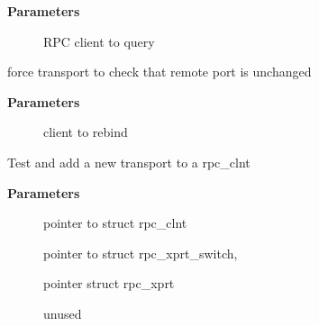 \documentclass[a4paper,8pt,english]{sphinxmanual}
\begin{document}
\textbf{Parameters}
\begin{description}
\item[{}] \leavevmode
RPC client to query

\end{description}

\begin{fulllineitems}
\label{networking/kapi:c.rpc_force_rebind}
force transport to check that remote port is unchanged

\end{fulllineitems}


\textbf{Parameters}
\begin{description}
\item[{}] \leavevmode
client to rebind

\end{description}

\begin{fulllineitems}
\label{networking/kapi:c.rpc_clnt_test_and_add_xprt}
Test and add a new transport to a rpc\_clnt

\end{fulllineitems}


\textbf{Parameters}
\begin{description}
\item[{}] \leavevmode
pointer to struct rpc\_clnt

\item[{}] \leavevmode
pointer to struct rpc\_xprt\_switch,

\item[{}] \leavevmode
pointer struct rpc\_xprt

\item[{}] \leavevmode
unused

\end{description}

\begin{fulllineitems}
\label{networking/kapi:c.rpc_clnt_setup_test_and_add_xprt}
\end{fulllineitems}
\end{document}
